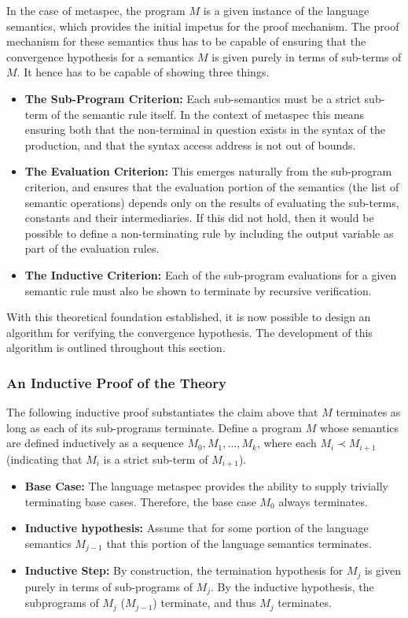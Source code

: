 In the case of \gls{metaspec}, the program $M$ is a given instance of the language semantics, which provides the initial impetus for the proof mechanism. 
The proof mechanism for these semantics thus has to be capable of ensuring that the convergence hypothesis for a semantics $M$ is given purely in terms of sub-terms of $M$. 
It hence has to be capable of showing three things.
\begin{itemize}
    \item \textbf{The Sub-Program Criterion:} Each sub-semantics must be a strict sub-term of the semantic rule itself. 
    In the context of \gls{metaspec} this means ensuring both that the non-terminal in question exists in the syntax of the production, and that the syntax access address is not out of bounds. 
    \item \textbf{The Evaluation Criterion:} This emerges naturally from the sub-program criterion, and ensures that the evaluation portion of the semantics (the list of semantic operations) depends only on the results of evaluating the sub-terms, constants and their intermediaries. 
    If this did not hold, then it would be possible to define a non-terminating rule by including the output variable as part of the evaluation rules. 
    \item \textbf{The Inductive Criterion:} Each of the sub-program evaluations for a given semantic rule must also be shown to terminate by recursive verification.
\end{itemize}

With this theoretical foundation established, it is now possible to design an algorithm for verifying the convergence hypothesis.
The development of this algorithm is outlined throughout this section.

\subsubsection{An Inductive Proof of the Theory} %
\label{ssub:an_inductive_proof_of_the_theory}
The following inductive proof substantiates the claim above that $M$ terminates as long as each of its sub-programs terminate. 
Define a program $M$ whose semantics are defined inductively as a sequence $M_0, M_1, \dots, M_k$, where each $M_i \prec M_{i+1}$ (indicating that $M_i$ is a strict sub-term of $M_{i+1}$).
\begin{itemize}
    \item \textbf{Base Case:} The language \gls{metaspec} provides the ability to supply trivially terminating base cases.
    Therefore, the base case $M_0$ always terminates. 
    \item \textbf{Inductive hypothesis:} Assume that for some portion of the language semantics $M_{j-1}$ that this portion of the language semantics terminates.
    \item \textbf{Inductive Step:} By construction, the termination hypothesis for $M_j$ is given purely in terms of sub-programs of $M_j$. 
    By the inductive hypothesis, the subprograms of $M_j$ ($M_{j-1}$) terminate, and thus $M_j$ terminates.
\end{itemize}

